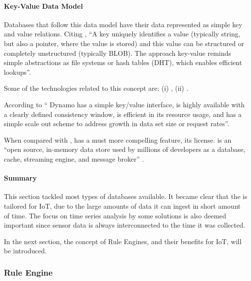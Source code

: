 \paragraph{Key-Value Data Model}
\label{par:stateofart:arch:infra:store:key}

Databases that follow this data model have their data represented as simple key and value relations. Citing \cite{pokorny2011nosql}, ``A key uniquely identifies a value (typically string, but also a pointer, where the value is stored) and this value can be structured or completely unstructured (typically BLOB). The approach key-value reminds simple abstractions as file systems or hash tables (DHT), which enables efficient lookups''.

Some of the technologies related to this concept are: (i) , (ii) .

According to \cite{decandia2007dynamo} `` Dynamo has a simple key/value interface, is highly available with a clearly defined consistency window, is efficient in its resource usage, and has a simple scale out scheme to address growth in data set size or request rates''.

When compared with ,  has a must more compelling feature, its license.  is an ``open source, in-memory data store used by millions of developers as a database, cache, streaming engine, and message broker'' \parencite{redis}.

\paragraph{Summary}
\label{par:stateofart:arch:infra:store:summary}

This section tackled most types of databases available. It became clear that the  is tailored for \gls{IoT}, due to the large amounts of data it can ingest in short amount of time. The focus on time series analysis by some solutions is also deemed important since sensor data is always interconnected to the time it was collected.

In the next section, the concept of Rule Engines, and their benefits for \gls{IoT}, will be introduced.

\subsubsection{Rule Engine}
\label{subsubsec:stateofart:arch:infra:rule}

